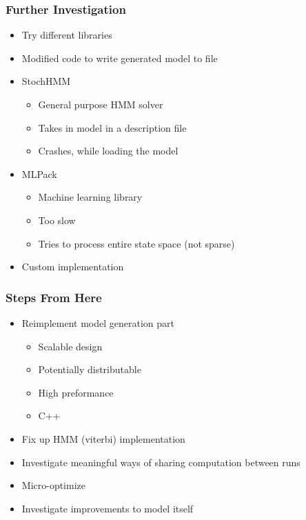 \documentclass{beamer}
\begin{document}
\begin{frame}[fragile]
\frametitle{Further Investigation}
\begin{itemize}
 \item Try different libraries
 \item Modified code to write generated model to file
 \item StochHMM
 \begin{itemize}
  \item General purpose HMM solver
  \item Takes in model in a description file
  \item Crashes, while loading the model
 \end{itemize}
 \item MLPack
 \begin{itemize}
  \item Machine learning library
  \item Too slow
  \item Tries to process entire state space (not sparse)
 \end{itemize}
 \item Custom implementation
\end{itemize}
\end{frame}


\begin{frame}
\frametitle{Steps From Here}
\begin{itemize}
 \item Reimplement model generation part
 \begin{itemize}
  \item Scalable design
  \item Potentially distributable
  \item High preformance
  \item C++
 \end{itemize}
 \item Fix up HMM (viterbi) implementation
 \item Investigate meaningful ways of sharing computation between runs
 \item Micro-optimize
 \item Investigate improvements to model itself
\end{itemize}

\end{frame}
\end{document}

